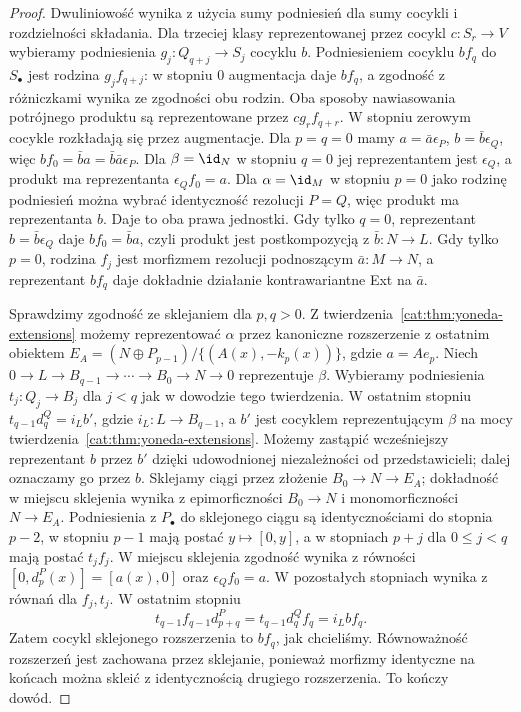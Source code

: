 \begin{proof}
Dwuliniowość wynika z użycia sumy podniesień dla sumy cocykli i rozdzielności składania. Dla trzeciej klasy reprezentowanej przez cocykl $c:S_r\to V$ wybieramy podniesienia $g_j:Q_{q+j}\to S_j$ cocyklu $b$. Podniesieniem cocyklu $bf_q$ do $S_\bullet$ jest rodzina $g_j f_{q+j}$: w stopniu $0$ augmentacja daje $bf_q$, a zgodność z różniczkami wynika ze zgodności obu rodzin. Oba sposoby nawiasowania potrójnego produktu są reprezentowane przez $c g_r f_{q+r}$. W stopniu zerowym cocykle rozkładają się przez augmentacje. Dla $p=q=0$ mamy $a=\bar a\epsilon_P$, $b=\bar b\epsilon_Q$, więc $bf_0=\bar b a=\bar b\bar a\epsilon_P$. Dla $\beta=\id_N$ w stopniu $q=0$ jej reprezentantem jest $\epsilon_Q$, a produkt ma reprezentanta $\epsilon_Q f_0=a$. Dla $\alpha=\id_M$ w stopniu $p=0$ jako rodzinę podniesień można wybrać identyczność rezolucji $P=Q$, więc produkt ma reprezentanta $b$. Daje to oba prawa jednostki. Gdy tylko $q=0$, reprezentant $b=\bar b\epsilon_Q$ daje $bf_0=\bar b a$, czyli produkt jest postkompozycją z $\bar b:N\to L$. Gdy tylko $p=0$, rodzina $f_j$ jest morfizmem rezolucji podnoszącym $\bar a:M\to N$, a reprezentant $bf_q$ daje dokładnie działanie kontrawariantne Ext na $\bar a$.

Sprawdzimy zgodność ze sklejaniem dla $p,q>0$. Z twierdzenia~\ref{cat:thm:yoneda-extensions} możemy reprezentować $\alpha$ przez kanoniczne rozszerzenie z ostatnim obiektem $E_A=(N\oplus P_{p-1})/\{(A(x),-k_p(x))\}$, gdzie $a=Ae_p$. Niech $0\to L\to B_{q-1}\to\cdots\to B_0\to N\to0$ reprezentuje $\beta$. Wybieramy podniesienia $t_j:Q_j\to B_j$ dla $j<q$ jak w dowodzie tego twierdzenia. W ostatnim stopniu $t_{q-1}d_q^Q=i_L b'$, gdzie $i_L:L\to B_{q-1}$, a $b'$ jest cocyklem reprezentującym $\beta$ na mocy twierdzenia~\ref{cat:thm:yoneda-extensions}. Możemy zastąpić wcześniejszy reprezentant $b$ przez $b'$ dzięki udowodnionej niezależności od przedstawicieli; dalej oznaczamy go przez $b$. Sklejamy ciągi przez złożenie $B_0\to N\to E_A$; dokładność w miejscu sklejenia wynika z epimorficzności $B_0\to N$ i monomorficzności $N\to E_A$. Podniesienia z $P_\bullet$ do sklejonego ciągu są identycznościami do stopnia $p-2$, w stopniu $p-1$ mają postać $y\mapsto[0,y]$, a w stopniach $p+j$ dla $0\le j<q$ mają postać $t_j f_j$. W miejscu sklejenia zgodność wynika z równości $[0,d_p^P(x)]=[a(x),0]$ oraz $\epsilon_Q f_0=a$. W pozostałych stopniach wynika z równań dla $f_j,t_j$. W ostatnim stopniu
\[
 t_{q-1} f_{q-1}d_{p+q}^P
 =t_{q-1}d_q^Q f_q=i_L b f_q.
\]
Zatem cocykl sklejonego rozszerzenia to $bf_q$, jak chcieliśmy. Równoważność rozszerzeń jest zachowana przez sklejanie, ponieważ morfizmy identyczne na końcach można skleić z identycznością drugiego rozszerzenia. To kończy dowód.
\end{proof}
